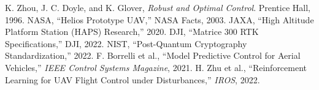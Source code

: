 \documentclass[conference]{IEEEtran}
\begin{document}

\begin{thebibliography}{99}
 K. Zhou, J. C. Doyle, and K. Glover, \emph{Robust and Optimal Control}. Prentice Hall, 1996.
 NASA, ``Helios Prototype UAV,'' NASA Facts, 2003.
 JAXA, ``High Altitude Platform Station (HAPS) Research,'' 2020.
 DJI, ``Matrice 300 RTK Specifications,'' DJI, 2022.
 NIST, ``Post-Quantum Cryptography Standardization,'' 2022.
 F. Borrelli et al., ``Model Predictive Control for Aerial Vehicles,'' \emph{IEEE Control Systems Magazine}, 2021.
 H. Zhu et al., ``Reinforcement Learning for UAV Flight Control under Disturbances,'' \emph{IROS}, 2022.
\end{thebibliography}
\end{document}
